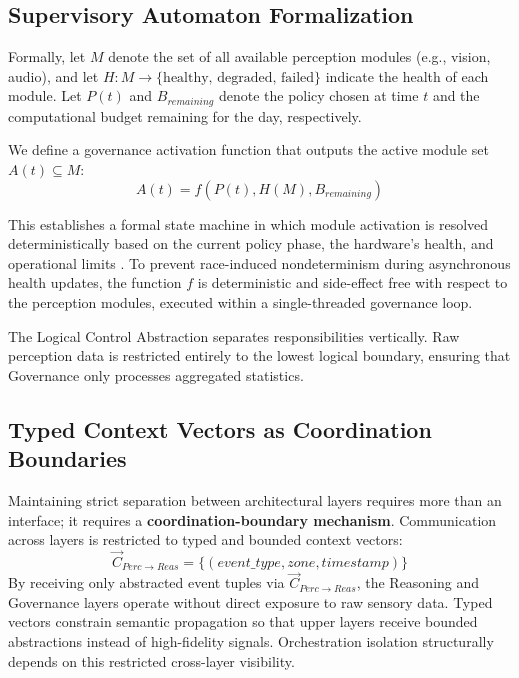 \documentclass[conference]{IEEEtran}
\begin{document}
\subsection{Supervisory Automaton Formalization}
Formally, let $M$ denote the set of all available perception modules (e.g., vision, audio), and let $H: M \rightarrow \{\text{healthy, degraded, failed}\}$ indicate the health of each module. Let $P(t)$ and $B_{remaining}$ denote the policy chosen at time $t$ and the computational budget remaining for the day, respectively.

We define a governance activation function that outputs the active module set $A(t) \subseteq M$:
\begin{equation}
A(t) = f(P(t), H(M), B_{remaining})
\end{equation}

This establishes a formal state machine in which module activation is resolved deterministically based on the current policy phase, the hardware's health, and operational limits \cite{b26}. To prevent race-induced nondeterminism during asynchronous health updates, the function $f$ is deterministic and side-effect free with respect to the perception modules, executed within a single-threaded governance loop.

The Logical Control Abstraction separates responsibilities vertically. Raw perception data is restricted entirely to the lowest logical boundary, ensuring that Governance only processes aggregated statistics.

\subsection{Typed Context Vectors as Coordination Boundaries}
Maintaining strict separation between architectural layers requires more than an interface; it requires a \textbf{coordination-boundary mechanism}. Communication across layers is restricted to typed and bounded context vectors:
\begin{equation}
\vec{C}_{Perc \to Reas} = \{(event\_type, zone, timestamp)\}
\end{equation}
By receiving only abstracted event tuples via $\vec{C}_{Perc \to Reas}$, the Reasoning and Governance layers operate without direct exposure to raw sensory data. Typed vectors constrain semantic propagation so that upper layers receive bounded abstractions instead of high-fidelity signals. Orchestration isolation structurally depends on this restricted cross-layer visibility.
\end{document}
